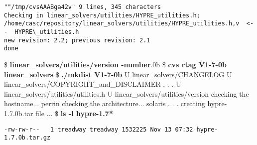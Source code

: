 \begin{ttfamily}
\begin{mdseries}
\begin{verbatim}
""/tmp/cvsAAABga42v" 9 lines, 345 characters
Checking in linear_solvers/utilities/HYPRE_utilities.h;
/home/casc/repository/linear_solvers/utilities/HYPRE_utilities.h,v  <--  HYPRE\_utilities.h
new revision: 2.2; previous revision: 2.1
done
\end{verbatim}
\$ \textbf{linear\_solvers/utilities/version -number}.0b\linebreak
\$ \textbf{cvs rtag V1-7-0b linear\_solvers}\linebreak
\$ \textbf{./mkdist V1-7-0b}\linebreak
U linear\_solvers/CHANGELOG\linebreak
U linear\_solvers/COPYRIGHT\_and\_DISCLAIMER\linebreak
 . . .\linebreak
U linear\_solvers/utilities/utilities.h\linebreak
U linear\_solvers/utilities/version\linebreak
checking the hostname... perrin\linebreak
checking the architecture... solaris\linebreak
 . . .\linebreak
creating hypre-1.7.0b.tar file ...\linebreak
\$ \textbf{ls -l hypre-1.7*}\linebreak
\begin{verbatim}
-rw-rw-r--   1 treadway treadway 1532225 Nov 13 07:32 hypre-1.7.0b.tar.gz


\end{verbatim}
\end{mdseries}
\end{ttfamily}
